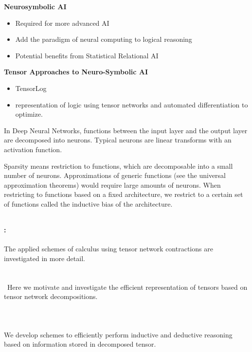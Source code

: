 \textbf{Neurosymbolic AI}
\begin{itemize}
    \item Required for more advanced AI \cite{hochreiter_toward_2022}
    \item Add the paradigm of neural computing to logical reasoning
    \item Potential benefits from Statistical Relational AI \cite{marra_statistical_2024}
\end{itemize}


\textbf{Tensor Approaches to Neuro-Symbolic AI}
\begin{itemize}
    \item TensorLog \cite{cohen_tensorlog_2020}
    \item \cite{badreddine_logic_2022} representation of logic using tensor networks and automated differentiation to optimize.
\end{itemize}

In Deep Neural Networks, functions between the input layer and the output layer are decomposed into neurons.
Typical neurons are linear transforms with an activation function.

Sparsity means restriction to functions, which are decomposable into a small number of neurons.
Approximations of generic functions (see the universal approximation theorems) would require large amounts of neurons. %
When restricting to functions based on a fixed architecture, we restrict to a certain set of functions called the inductive bias of the architecture.

\ \\
\textbf{: \partthreetext}\\
\ \\
The applied schemes of calculus using tensor network contractions are investigated in more detail.
\ \\
\textbf{\focusonespec}\\
\\\
Here we motivate and investigate the efficient representation of tensors based on tensor network decompositions. \\
\ \\
\textbf{\focustwospec}\\
\ \\
We develop schemes to efficiently perform inductive and deductive reasoning based on information stored in decomposed tensor.


%
%
%
%

